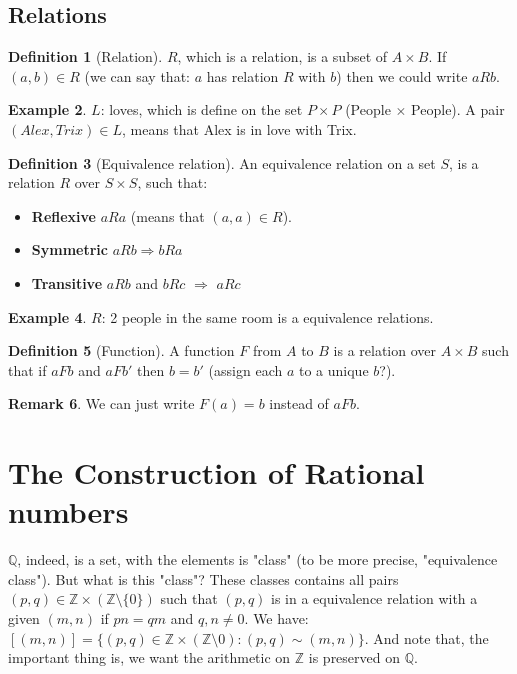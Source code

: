 \documentclass[12pt]{article}
\theoremstyle{definition}
\newtheorem{definition}{Definition}[section]
\newtheorem{example}[definition]{Example}
\newtheorem{remark}[definition]{Remark}
\theoremstyle{plain}
\begin{document}
\subsection{Relations}

\begin{definition}[Relation]
$R$, which is a relation, is a subset of $A \times B$. If $(a, b) \in R$ (we can say that: $a$ has relation $R$ with $b$) then we could write $aRb$.
\end{definition}

\begin{example}
$L$: loves, which is define on the set $P \times P$ (People $\times$ People). A pair $(Alex, Trix) \in L$, means that Alex is in love with Trix.
\end{example}

\begin{definition}[Equivalence relation]
An equivalence relation on a set $S$, is a relation $R$ over $S \times S$, such that:
\begin{itemize}
    \item \textbf{Reflexive} $aRa$ (means that $(a, a) \in R$).
    \item \textbf{Symmetric} $aRb \Rightarrow bRa$
    \item \textbf{Transitive} $aRb$ and $bRc$ $\Rightarrow$ $aRc$
\end{itemize}
\end{definition}

\begin{example}
$R$: 2 people in the same room is a equivalence relations.    
\end{example}

\begin{definition}[Function]
A function $F$ from $A$ to $B$ is a relation over $A \times B$ such that if $aFb$ and $aFb'$ then $b = b'$ (assign each $a$ to a unique $b$?).    
\end{definition}

\begin{remark}
We can just write $F(a)=b$ instead of $aFb$.
\end{remark}

\section{The Construction of Rational numbers}
\begin{note}
$\mathbb{Q}$, indeed, is a set, with the elements is "class" (to be more precise, "equivalence class"). But what is this "class"? These classes contains all pairs $(p,q) \in \mathbb{Z} \times (\mathbb{Z} \setminus \{0\})$  such that $(p,q)$ is in a equivalence relation with a given $(m,n)$ if $pn=qm$ and $q,n \neq 0$. We have: $[(m,n)]=\{(p,q) \in \mathbb{Z}\times (\mathbb{Z}\setminus {0}):(p,q) \sim (m,n)\}$. And note that, the important thing is, we want the arithmetic on $\mathbb{Z}$ is preserved on $\mathbb{Q}$.
\end{note}
\end{document}
